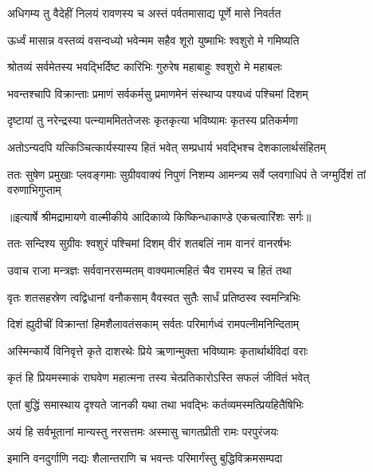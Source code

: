 \twolineshloka
{अधिगम्य तु वैदेहीं निलयं रावणस्य च}
{अस्तं पर्वतमासाद्य पूर्णे मासे निवर्तत} %

\twolineshloka
{ऊर्ध्वं मासान्न वस्तव्यं वसन्वध्यो भवेन्मम}
{सहैव शूरो युष्माभिः श्वशुरो मे गमिष्यति} %

\twolineshloka
{श्रोतव्यं सर्वमेतस्य भवद्भिर्दिष्ट कारिभिः}
{गुरुरेष महाबाहुः श्वशुरो मे महाबलः} %

\twolineshloka
{भवन्तश्चापि विक्रान्ताः प्रमाणं सर्वकर्मसु}
{प्रमाणमेनं संस्थाप्य पश्यध्वं पश्चिमां दिशम्} %

\twolineshloka
{दृष्टायां तु नरेन्द्रस्या पत्न्याममिततेजसः}
{कृतकृत्या भविष्यामः कृतस्य प्रतिकर्मणा} %

\twolineshloka
{अतोऽन्यदपि यत्किञ्चित्कार्यस्यास्य हितं भवेत्}
{सम्प्रधार्य भवद्भिश्च देशकालार्थसंहितम्} %

\fourlineindentedshloka
{ततः सुषेण प्रमुखाः प्लवङ्गमाः}
{सुग्रीववाक्यं निपुणं निशम्य}
{आमन्त्र्य सर्वे प्लवगाधिपं ते}
{जग्मुर्दिशं तां वरुणाभिगुप्ताम्} %


{॥इत्यार्षे श्रीमद्रामायणे वाल्मीकीये आदिकाव्ये किष्किन्धाकाण्डे एकचत्वारिंशः सर्गः॥}


\twolineshloka
{ततः सन्दिश्य सुग्रीवः श्वशुरं पश्चिमां दिशम्}
{वीरं शतबलिं नाम वानरं वानरर्षभः} %

\twolineshloka
{उवाच राजा मन्त्रज्ञः सर्ववानरसम्मतम्}
{वाक्यमात्महितं चैव रामस्य च हितं तथा} %

\twolineshloka
{वृतः शतसहस्रेण त्वद्विधानां वनौकसाम्}
{वैवस्वत सुतैः सार्धं प्रतिष्ठस्व स्वमन्त्रिभिः} %

\twolineshloka
{दिशं ह्युदीचीं विक्रान्तां हिमशैलावतंसकाम्}
{सर्वतः परिमार्गध्वं रामपत्नीमनिन्दिताम्} %

\twolineshloka
{अस्मिन्कार्ये विनिवृत्ते कृते दाशरथेः प्रिये}
{ऋणान्मुक्ता भविष्यामः कृतार्थार्थविदां वराः} %

\twolineshloka
{कृतं हि प्रियमस्माकं राघवेण महात्मना}
{तस्य चेत्प्रतिकारोऽस्ति सफलं जीवितं भवेत्} %

\twolineshloka
{एतां बुद्धिं समास्थाय दृश्यते जानकी यथा}
{तथा भवद्भिः कर्तव्यमस्मत्प्रियहितैषिभिः} %

\twolineshloka
{अयं हि सर्वभूतानां मान्यस्तु नरसत्तमः}
{अस्मासु चागतप्रीती रामः परपुरंजयः} %

\twolineshloka
{इमानि वनदुर्गाणि नद्यः शैलान्तराणि च}
{भवन्तः परिमार्गंस्तु बुद्धिविक्रमसम्पदा} %

